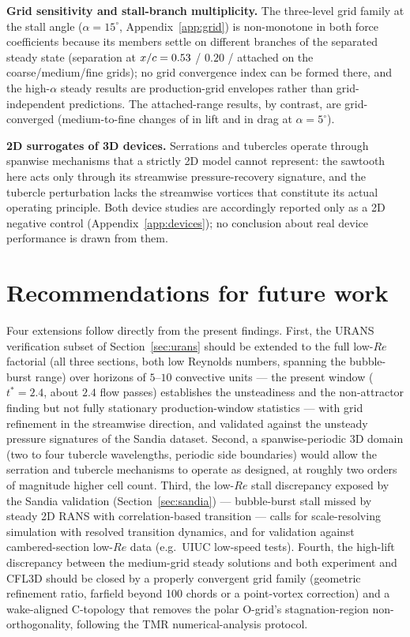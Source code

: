 \documentclass[11pt,a4paper]{article}
\begin{document}
\textbf{Grid sensitivity and stall-branch multiplicity.} The three-level grid family at the stall angle ($\alpha = 15^\circ$, Appendix~\ref{app:grid}) is non-monotone in both force coefficients because its members settle on different branches of the separated steady state (separation at $x/c = 0.53{}$ / $0.20$ / attached on the coarse/medium/fine grids); no grid convergence index can be formed there, and the high-$\alpha$ steady results are production-grid envelopes rather than grid-independent predictions. The attached-range results, by contrast, are grid-converged (medium-to-fine changes of \ClGridDelta{} in lift and \CdGridDelta{} in drag at $\alpha = 5^\circ$).

\textbf{2D surrogates of 3D devices.} Serrations and tubercles operate through spanwise mechanisms that a strictly 2D model cannot represent: the sawtooth here acts only through its streamwise pressure-recovery signature, and the tubercle perturbation lacks the streamwise vortices that constitute its actual operating principle. Both device studies are accordingly reported only as a 2D negative control (Appendix~\ref{app:devices}); no conclusion about real device performance is drawn from them.

\section{Recommendations for future work}
Four extensions follow directly from the present findings. First, the URANS verification subset of Section~\ref{sec:urans} should be extended to the full low-$Re$ factorial (all three sections, both low Reynolds numbers, spanning the bubble-burst range) over horizons of $5$--$10$ convective units --- the present window ($t^* = 2.4$, about $2.4$ flow passes) establishes the unsteadiness and the non-attractor finding but not fully stationary production-window statistics --- with grid refinement in the streamwise direction, and validated against the unsteady pressure signatures of the Sandia dataset. Second, a spanwise-periodic 3D domain (two to four tubercle wavelengths, periodic side boundaries) would allow the serration and tubercle mechanisms to operate as designed, at roughly two orders of magnitude higher cell count. Third, the low-$Re$ stall discrepancy exposed by the Sandia validation (Section~\ref{sec:sandia}) --- bubble-burst stall missed by steady 2D RANS with correlation-based transition --- calls for scale-resolving simulation with resolved transition dynamics, and for validation against cambered-section low-$Re$ data (e.g.\ UIUC low-speed tests). Fourth, the high-lift discrepancy between the medium-grid steady solutions and both experiment and CFL3D should be closed by a properly convergent grid family (geometric refinement ratio, farfield beyond 100 chords or a point-vortex correction) and a wake-aligned C-topology that removes the polar O-grid's stagnation-region non-orthogonality, following the TMR numerical-analysis protocol.
\end{document}
